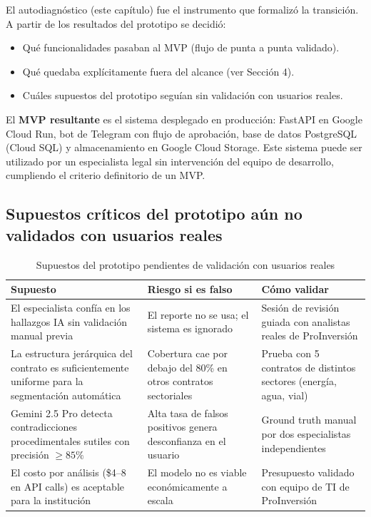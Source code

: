 El autodiagnóstico (este capítulo) fue el instrumento que formalizó la
transición. A partir de los resultados del prototipo se decidió:

\begin{itemize}
    \item Qué funcionalidades pasaban al MVP (flujo de punta a punta validado).
    \item Qué quedaba explícitamente fuera del alcance (ver Sección 4).
    \item Cuáles supuestos del prototipo seguían sin validación con usuarios reales.
\end{itemize}

El \textbf{MVP resultante} es el sistema desplegado en producción: FastAPI en
Google Cloud Run, bot de Telegram con flujo de aprobación, base de datos
PostgreSQL (Cloud SQL) y almacenamiento en Google Cloud Storage. Este sistema
puede ser utilizado por un especialista legal sin intervención del equipo de
desarrollo, cumpliendo el criterio definitorio de un MVP.

\subsection{Supuestos críticos del prototipo aún no validados con usuarios reales}

\begin{table}[H]
\centering
\caption{Supuestos del prototipo pendientes de validación con usuarios reales}
\label{tab:supuestos}
\begin{tabular}{p{5cm} p{5cm} p{4cm}}
\toprule
\textbf{Supuesto} & \textbf{Riesgo si es falso} & \textbf{Cómo validar} \\
\midrule
El especialista confía en los hallazgos IA sin validación manual previa &
El reporte no se usa; el sistema es ignorado &
Sesión de revisión guiada con analistas reales de ProInversión \\
\addlinespace
La estructura jerárquica del contrato es suficientemente uniforme para
la segmentación automática &
Cobertura cae por debajo del 80\% en otros contratos sectoriales &
Prueba con 5 contratos de distintos sectores (energía, agua, vial) \\
\addlinespace
Gemini 2.5 Pro detecta contradicciones procedimentales sutiles con
precisión $\geq85\%$ &
Alta tasa de falsos positivos genera desconfianza en el usuario &
Ground truth manual por dos especialistas independientes \\
\addlinespace
El costo por análisis (\$4–8 en API calls) es aceptable para la
institución &
El modelo no es viable económicamente a escala &
Presupuesto validado con equipo de TI de ProInversión \\
\bottomrule
\end{tabular}
\end{table}

